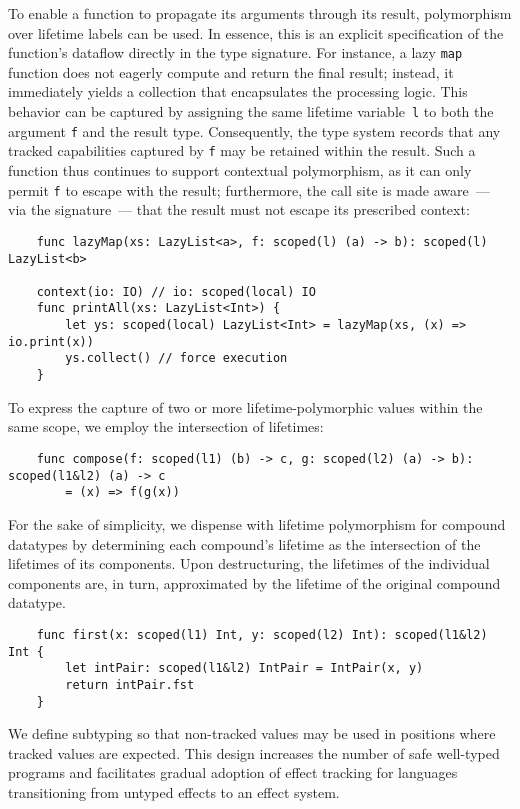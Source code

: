 \documentclass[acmsmall]{acmart}
\begin{document}
To enable a function to propagate its arguments through its result, polymorphism over lifetime labels can be used.
In essence, this is an explicit specification of the function’s dataflow directly in the type signature. %
For instance, a lazy \texttt{map} function does not eagerly compute and return the final result; instead, it immediately yields a collection that encapsulates the processing logic.
This behavior can be captured by assigning the same lifetime variable~\texttt{l} to both the argument \texttt{f} and the result type.
Consequently, the type system records that any tracked capabilities captured by \texttt{f} may be retained within the result.
Such a function thus continues to support contextual polymorphism, as it can only permit \texttt{f} to escape with the result; furthermore, the call site is made aware~--- via the signature~--- that the result must not escape its prescribed context:
\begin{verbatim}
    func lazyMap(xs: LazyList<a>, f: scoped(l) (a) -> b): scoped(l) LazyList<b>

    context(io: IO) // io: scoped(local) IO
    func printAll(xs: LazyList<Int>) {
        let ys: scoped(local) LazyList<Int> = lazyMap(xs, (x) => io.print(x))
        ys.collect() // force execution
    }
\end{verbatim}

To express the capture of two or more lifetime-polymorphic values within the same scope, we employ the intersection of lifetimes:
\begin{verbatim}
    func compose(f: scoped(l1) (b) -> c, g: scoped(l2) (a) -> b): scoped(l1&l2) (a) -> c
        = (x) => f(g(x))
\end{verbatim}

For the sake of simplicity, we dispense with lifetime polymorphism for compound datatypes by determining each compound's lifetime as the intersection of the lifetimes of its components.
Upon destructuring, the lifetimes of the individual components are, in turn, approximated by the lifetime of the original compound datatype.
\begin{verbatim}
    func first(x: scoped(l1) Int, y: scoped(l2) Int): scoped(l1&l2) Int {
        let intPair: scoped(l1&l2) IntPair = IntPair(x, y)
        return intPair.fst
    }
\end{verbatim}

We define subtyping so that non-tracked values may be used in positions where tracked values are expected.
This design increases the number of safe well-typed programs and facilitates gradual adoption of effect tracking for languages transitioning from untyped effects to an effect system.
\end{document}
